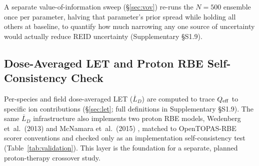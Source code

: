 A separate value-of-information sweep (\S\ref{sec:vov}) re-runs the $N=500$
ensemble once per parameter, halving that parameter's prior spread while
holding all others at baseline, to quantify how much narrowing any one
source of uncertainty would actually reduce REID uncertainty
(Supplementary \S{}S1.9).
\label{sec:vovmethod}

\subsection{Dose-Averaged LET and Proton RBE Self-Consistency Check}
\label{sec:letmethod}
\label{sec:rbemethods}

Per-species and field dose-averaged LET ($\overline{L}_D$) are computed to
trace $Q_\mathrm{eff}$ to specific ion contributions (\S\ref{sec:let}; full
definitions in Supplementary \S{}S1.9). The same $\overline{L}_D$
infrastructure also implements two proton RBE models, Wedenberg et~al.\
(2013) \citep{wedenberg2013} and McNamara et~al.\ (2015)
\citep{mcnamara2015}, matched to OpenTOPAS-RBE scorer conventions and
checked only as an implementation self-consistency test
(Table~\ref{tab:validation}). This
layer is the foundation for a separate, planned proton-therapy crossover
study.
